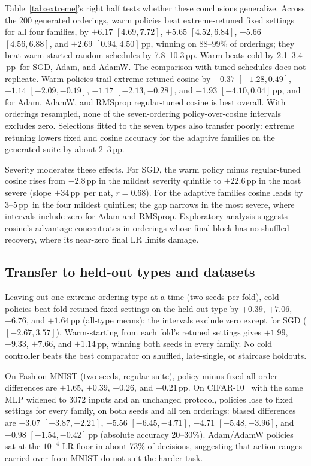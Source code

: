 \documentclass{article}
\newcommand{\pp}{\ensuremath{\,\mathrm{pp}}}
\begin{document}
Table~\ref{tab:extreme}'s right half tests whether these conclusions generalize. Across the 200 generated orderings, warm policies beat extreme-retuned fixed settings for all four families, by $+6.17$ $[4.69,7.72]$, $+5.65$ $[4.52,6.84]$, $+5.66$ $[4.56,6.88]$, and $+2.69$ $[0.94,4.50]\pp$, winning on 88--99\% of orderings; they beat warm-started random schedules by 7.8--10.3\pp. Warm beats cold by 2.1--3.4\pp\ for SGD, Adam, and AdamW. The comparison with tuned schedules does not replicate. Warm policies trail extreme-retuned cosine by $-0.37$ $[-1.28,0.49]$, $-1.14$ $[-2.09,-0.19]$, $-1.17$ $[-2.13,-0.28]$, and $-1.93$ $[-4.10,0.04]\pp$, and for Adam, AdamW, and RMSprop regular-tuned cosine is best overall. With orderings resampled, none of the seven-ordering policy-over-cosine intervals excludes zero. Selections fitted to the seven types also transfer poorly: extreme retuning lowers fixed and cosine accuracy for the adaptive families on the generated suite by about 2--3\pp.

Severity moderates these effects. For SGD, the warm policy minus regular-tuned cosine rises from $-2.8\pp$ in the mildest severity quintile to $+22.6\pp$ in the most severe (slope $+34$\pp\ per nat, $r=0.68$). For the adaptive families cosine leads by 3--5\pp\ in the four mildest quintiles; the gap narrows in the most severe, where intervals include zero for Adam and RMSprop. Exploratory analysis suggests cosine's advantage concentrates in orderings whose final block has no shuffled recovery, where its near-zero final LR limits damage.

\subsection{Transfer to held-out types and datasets}
Leaving out one extreme ordering type at a time (two seeds per fold), cold policies beat fold-retuned fixed settings on the held-out type by $+0.39$, $+7.06$, $+6.76$, and $+1.64\pp$ (all-type means); the intervals exclude zero except for SGD ($[-2.67,3.57]$). Warm-starting from each fold's retuned settings gives $+1.99$, $+9.33$, $+7.66$, and $+1.14\pp$, winning both seeds in every family. No cold controller beats the best comparator on shuffled, late-single, or staircase holdouts.

On Fashion-MNIST (two seeds, regular suite), policy-minus-fixed all-order differences are $+1.65$, $+0.39$, $-0.26$, and $+0.21\pp$. On CIFAR-10~\cite{krizhevsky2009} with the same MLP widened to 3072 inputs and an unchanged protocol, policies lose to fixed settings for every family, on both seeds and all ten orderings: biased differences are $-3.07$ $[-3.87,-2.21]$, $-5.56$ $[-6.45,-4.71]$, $-4.71$ $[-5.48,-3.96]$, and $-0.98$ $[-1.54,-0.42]\pp$ (absolute accuracy 20--30\%). Adam/AdamW policies sat at the $10^{-4}$ LR floor in about 73\% of decisions, suggesting that action ranges carried over from MNIST do not suit the harder task.
\end{document}
